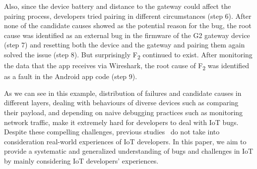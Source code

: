 Also, since the device battery and distance to the gateway could affect the pairing process, developers tried pairing in different circumstances (step 6). After none of the candidate causes showed as the potential reason for the bug, the root cause was identified as an external bug in the firmware of the G2 gateway device (step 7) and resetting both the device and the gateway and pairing them again solved the issue (step 8). But surprisingly F\textsubscript{2} continued to exist. After monitoring the data that the app receives via Wireshark, the root cause of F\textsubscript{2} was identified as a fault in the Android app code (step 9).


As we can see in this example, distribution of failures and candidate causes in different layers, dealing with behaviours of diverse devices such as comparing their payload, and depending on naive debugging practices such as monitoring network traffic, make it extremely hard for developers to deal with IoT bugs. Despite these compelling challenges, previous studies~\cite{hnat2011hitchhiker,corno2019challenges,stojkoska2017review,chen2017application,IoTOSBugs} do not take into consideration real-world experiences of IoT developers. In this paper, we aim to provide a systematic and generalized understanding of bugs and challenges in IoT by mainly considering IoT developers' experiences.

\endinput

